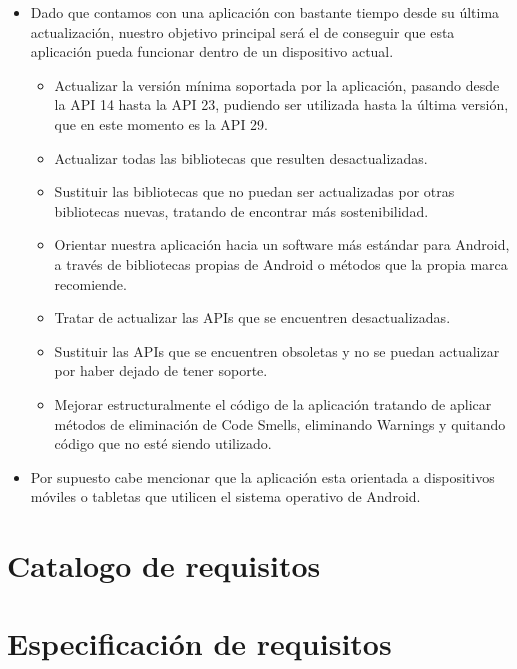 \begin{itemize}
\item Dado que contamos con una aplicación con bastante tiempo desde su última actualización, nuestro objetivo principal será el de conseguir que esta aplicación pueda funcionar dentro de un dispositivo actual.
	\begin{itemize}
	\item Actualizar la versión mínima soportada por la aplicación, pasando desde la API 14 hasta la API 23, pudiendo ser utilizada hasta la última versión, que en este momento es la API 29.
	\item Actualizar todas las bibliotecas que resulten desactualizadas.
	\item Sustituir las bibliotecas que no puedan ser actualizadas por otras bibliotecas nuevas, tratando de encontrar más sostenibilidad.
	\item Orientar nuestra aplicación hacia un software más estándar para Android, a través de bibliotecas propias de Android o métodos que la propia marca recomiende.
	\item Tratar de actualizar las APIs que se encuentren desactualizadas.
	\item Sustituir las APIs que se encuentren obsoletas y no se puedan actualizar por haber dejado de tener soporte.
	\item Mejorar estructuralmente el código de la aplicación tratando de aplicar métodos de eliminación de Code Smells, eliminando Warnings y quitando código que no esté siendo utilizado.
	\end{itemize}
\item Por supuesto cabe mencionar que la aplicación esta orientada a dispositivos móviles o tabletas que utilicen el sistema operativo de Android.
\end{itemize}

\section{Catalogo de requisitos}

\section{Especificación de requisitos}



